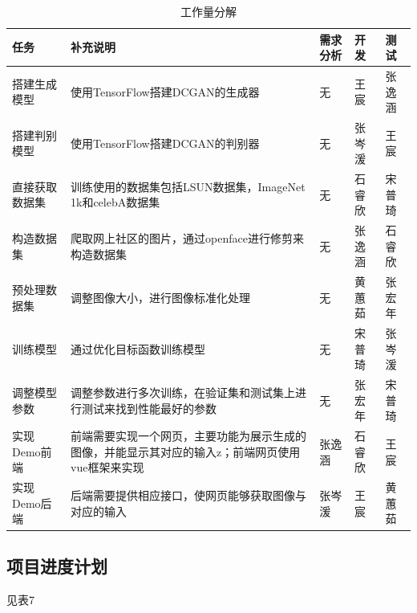 \documentclass[hyperref, a4paper]{ctexart}
\begin{document}
\begin{table}
    \caption{工作量分解}
    \centering
    \begin{tabular}{|p{3.0cm}<{\centering}|p{5.0cm}<{\centering}|p{1.5cm}<{\centering}|p{1.5cm}<{\centering}|p{1.5cm}<{\centering}|}
    \hline
    任务       & 补充说明                                               & 需求分析 & 开发  & 测试  \\ \hline
    搭建生成模型   & 使用TensorFlow搭建DCGAN的生成器                            & 无    & 王宸  & 张逸涵 \\ \hline
    搭建判别模型   & 使用TensorFlow搭建DCGAN的判别器                            & 无    & 张岑湲 & 王宸  \\ \hline
    直接获取数据集  & 训练使用的数据集包括LSUN数据集，ImageNet 1k和celebA数据集            & 无    & 石睿欣 & 宋普琦 \\ \hline
    构造数据集    & 爬取网上社区的图片，通过openface进行修剪来构造数据集                     & 无    & 张逸涵 & 石睿欣 \\ \hline
    预处理数据集   & 调整图像大小，进行图像标准化处理                                   & 无    & 黄蕙茹 & 张宏年 \\ \hline
    训练模型     & 通过优化目标函数训练模型                                       & 无    & 宋普琦 & 张岑湲 \\ \hline
    调整模型参数   & 调整参数进行多次训练，在验证集和测试集上进行测试来找到性能最好的参数                 & 无    & 张宏年 & 宋普琦 \\ \hline
    实现Demo前端 & 前端需要实现一个网页，主要功能为展示生成的图像，并能显示其对应的输入z；前端网页使用vue框架来实现 & 张逸涵  & 石睿欣 & 王宸  \\ \hline
    实现Demo后端 & 后端需要提供相应接口，使网页能够获取图像与对应的输入                         & 张岑湲  & 王宸  & 黄蕙茹 \\ \hline
    \end{tabular}
\end{table}

\hypertarget{ux9879ux76eeux8fdbux5ea6ux8ba1ux5212}{%
\subsection{项目进度计划}\label{ux9879ux76eeux8fdbux5ea6ux8ba1ux5212}}

见表7
\end{document}

